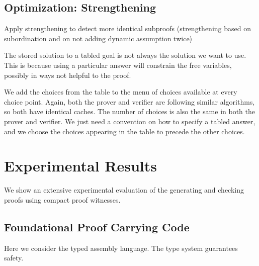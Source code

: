 \documentclass{acmconf}
\newcommand{\figfoot}{\vspace{1ex}\hrule}
\newcommand{\fighead}{\hrule\vspace{1.5ex}}
\newcommand{\andl}{\wedge}
\newcommand{\impl}{\supset}
\begin{document}
\subsection{Optimization: Strengthening}

Apply strengthening to detect more identical subproofs (strengthening
based on subordination and on not adding dynamic assumption twice)

The stored solution to a tabled goal is not always the solution we
want to use.  This is because using a particular answer will constrain
the free variables, possibly in ways not helpful to the proof. 

We add the choices from the table to the menu of choices available at
every choice point. Again, both the prover and verifier are following
similar algorithms, so both have identical caches. The number of
choices is also the same in both the prover and verifier. We just need
a convention on how to specify a tabled answer, and we choose the
choices appearing in the table to precede the other choices.



\section{Experimental Results}

We show an extensive experimental evaluation of the generating and
checking proofs using compact proof witnesses.

\subsection{Foundational Proof Carrying Code}
Here we consider the typed assembly language. The type system
guarantees safety.
\end{document}
